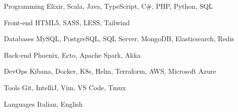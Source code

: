 \documentclass{resume} %
\begin{document}


\begin{cvSkills}


  \cvSkill
    {Programming}
    {Elixir, Scala, Java, TypeScript, C\#, PHP, Python, SQL}


  \cvSkill
    {Front-end}
    {HTML5, SASS, LESS, Tailwind}


  \cvSkill
    {Databases}
    {MySQL, PostgreSQL, SQL Server, MongoDB, Elasticsearch, Redis}


  \cvSkill
    {Back-end}
    {Phoenix, Ecto, Apache Spark, Akka}


  \cvSkill
    {DevOps}
    {Kibana, Docker, K8s, Helm, Terraform, AWS, Microsoft Azure}


  \cvSkill
    {Tools}
    {Git, IntelliJ, Vim, VS Code, Tmux}


  \cvSkill
    {}{}


  \cvSkill
    {Languages}
    {Italian, English}


\end{cvSkills}

\end{document}
